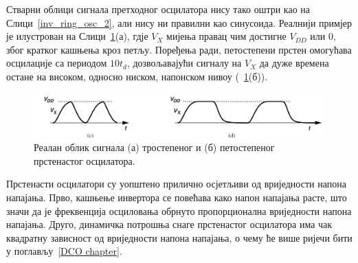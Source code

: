 \documentclass[master]{finthesis}
\begin{document}
Стварни облици сигнала претходног осцилатора нису тако оштри као на Слици~\ref{inv_ring_osc_2}, али нису ни правилни као синусоида. Реалнији примјер је илустрован на Слици~\ref{inv_ring_osc_3}(а), гдје $V_{X}$ мијења правац чим достигне $V_{DD}$ или 0, због кратког кашњења кроз петљу. Поређења ради, петостепени прстен омогућава осцилације са периодом $10t_{d}$, дозвољавајући сигналу на $V_{X}$ да дуже времена остане на високом, односно ниском, напонском нивоу (\figurename~\ref{inv_ring_osc_3}(б)). \par
\begin{figure}[!ht]
	 \centering
	 \includegraphics[scale=0.3]{slike/inv_ring_osc_3.png}
	 \caption{Реалан облик сигнала (а) тростепеног и (б) петостепеног прстенастог осцилатора.}
	 \label{inv_ring_osc_3}
\end{figure}
Прстенасти осцилатори су уопштено прилично осјетљиви од вриједности напона напајања. Прво, кашњење инвертора се повећава како напон напајања расте, што значи да је фреквенција осциловања обрнуто пропорционална вриједности напона напајања. Друго, динамичка потрошња снаге прстенастог осцилатора има чак квадратну зависност од вриједности напона напајања, о чему ће више ријечи бити у поглављу~\ref{DCO chapter}.
\end{document}
